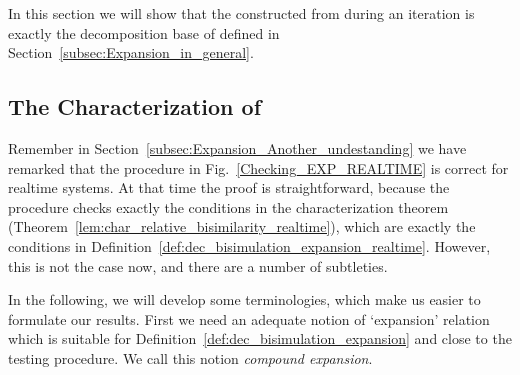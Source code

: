 \documentclass{llncs}
\begin{document}
In this section we will show that the  constructed from  during an iteration is exactly the decomposition base of  defined in Section~\ref{subsec:Expansion_in_general}.


\subsection{The Characterization of }\label{subsec:Expansion_characterization}


Remember in Section~\ref{subsec:Expansion_Another_undestanding} we have remarked that the procedure in Fig.~\ref{Checking_EXP_REALTIME} is correct for realtime systems. At that time the proof is straightforward, because the procedure checks exactly the conditions in the characterization theorem (Theorem~\ref{lem:char_relative_bisimilarity_realtime}), which are exactly the conditions in Definition~\ref{def:dec_bisimulation_expansion_realtime}.  However, this is not the case now, and there are a number of subtleties.


In the following, we will develop some terminologies, which make us easier to formulate our results. First we need an adequate notion of `expansion' relation which is suitable for Definition~\ref{def:dec_bisimulation_expansion} and close to the testing procedure.  We call this notion {\em compound expansion}.
\end{document}
